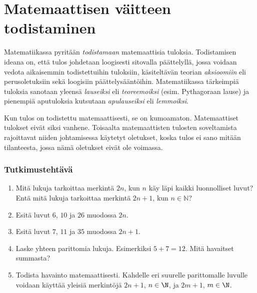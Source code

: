 \chapter{Matemaattisen väitteen todistaminen}

Matematiikassa pyritään {\em todistamaan} matemaattisia tuloksia. Todistamisen ideana on, että tulos johdetaan loogisesti sitovalla päättelyllä, jossa voidaan vedota aikaisemmin todistettuihin tuloksiin, käsiteltävän teorian {\em aksioomiin} eli perusoletuksiin sekä loogisiin päättelysääntöihin. Matematiikassa tärkeimpiä tuloksia sanotaan yleensä {\em lauseiksi} eli {\em teoreemoiksi} (esim. Pythagoraan lause) ja pienempiä aputuloksia kutsutaan {\em apulauseiksi} eli {\em lemmoiksi}.

Kun tulos on todistettu matemaattisesti, se on kumoamaton. Matemaattiset tulokset eivät siksi vanhene. Toisaalta matemaattisten tulosten soveltamista rajoittavat niiden johtamisessa käytetyt oletukset, koska tulos ei sano mitään tilanteesta, jossa nämä oletukset eivät ole voimassa.

\subsection*{Tutkimustehtävä}
\begin{enumerate}
\item Mitä lukuja tarkoittaa merkintä $2n$, kun $n$ käy läpi kaikki luonnolliset luvut? Entä mitä lukuja tarkoittaa merkintä $2n + 1$, kun $n\in \mathbb{N}$?
\item %
Esitä luvut $6$, $10$ ja $26$ muodossa $2n$.
\item %
Esitä luvut $7$, $11$ ja $35$ muodossa $2n+1$.
\item Laske yhteen parittomia lukuja. Esimerkiksi $5 + 7 = 12$. Mitä havaitset summasta?
\item Todista havainto matemaattisesti. Kahdelle eri suurelle parittomalle luvulle voidaan käyttää yleisiä merkintöjä $2n + 1$, $n \in\N$, ja $2m + 1$, $m \in\N$.
\end{enumerate}

